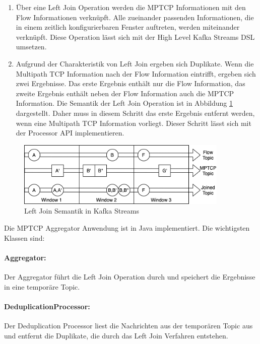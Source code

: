 \documentclass[a4paper, 12pt]{article}
\begin{document}
\begin{enumerate}
\item Über eine Left Join Operation werden die MPTCP Informationen mit den Flow Informationen verknüpft. Alle zueinander passenden Informationen, die in einem zeitlich konfigurierbaren Fenster auftreten, werden miteinander verknüpft. Diese Operation lässt sich mit der High Level Kafka Streams DSL umsetzen.
\item Aufgrund der Charakteristik von Left Join ergeben sich Duplikate. Wenn die Multipath TCP Information nach der Flow Information eintrifft, ergeben sich zwei Ergebnisse. Das erste Ergebnis enthält nur die Flow Information, das zweite Ergebnis enthält neben der Flow Information auch die MPTCP Information. Die Semantik der Left Join Operation ist in Abbildung \ref{fig:leftjoinsemantics} dargestellt. Daher muss in diesem Schritt das erste Ergebnis entfernt werden, wenn eine Multipath TCP Information vorliegt. Dieser Schritt lässt sich mit der Processor API implementieren.
\end{enumerate}

\begin{figure}[H]
    \centering
    \includegraphics[width=0.9\textwidth]{images/leftjoinsemantic.png}
    \caption{Left Join Semantik in Kafka Streams}
    \label{fig:leftjoinsemantics}
\end{figure}

Die MPTCP Aggregator Anwendung ist in Java implementiert.
Die wichtigsten Klassen sind:

\paragraph{Aggregator:} Der Aggregator führt die Left Join Operation durch und speichert die Ergebnisse in eine temporäre Topic.

\paragraph{DeduplicationProcessor:} Der Deduplication Processor liest die Nachrichten aus der temporären Topic aus und entfernt die Duplikate, die durch das Left Join Verfahren entstehen.
\end{document}
